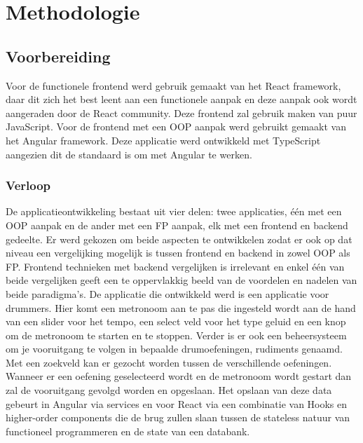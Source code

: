 
\chapter{Methodologie}
\label{ch:methodologie}


\section{Voorbereiding}
Voor de functionele frontend werd gebruik gemaakt van het React framework, daar dit zich het best leent aan een functionele aanpak en deze aanpak ook wordt aangeraden door de React community. Deze frontend zal gebruik maken van puur JavaScript. Voor de frontend met een OOP aanpak werd gebruikt gemaakt van het Angular framework. Deze applicatie werd ontwikkeld met TypeScript aangezien dit de standaard is om met Angular te werken.

\subsection{Verloop}
De applicatieontwikkeling bestaat uit vier delen: twee applicaties, één met een OOP aanpak en de ander met een FP aanpak, elk met een frontend en backend gedeelte. Er werd gekozen om beide aspecten te ontwikkelen zodat er ook op dat niveau een vergelijking mogelijk is tussen frontend en backend in zowel OOP als FP. Frontend technieken met backend vergelijken is irrelevant en enkel één van beide vergelijken geeft een te oppervlakkig beeld van de voordelen en nadelen van beide paradigma's. De applicatie die ontwikkeld werd is een applicatie voor drummers. Hier komt een metronoom aan te pas die ingesteld wordt aan de hand van een slider voor het tempo, een select veld voor het type geluid en een knop om de metronoom te starten en te stoppen. Verder is er ook een beheersysteem om je vooruitgang te volgen in bepaalde drumoefeningen, rudiments genaamd. Met een zoekveld kan er gezocht worden tussen de verschillende oefeningen. Wanneer er een oefening geselecteerd wordt en de metronoom wordt gestart dan zal de vooruitgang gevolgd worden en opgeslaan. Het opslaan van deze data gebeurt in Angular via services en voor React via een combinatie van Hooks en higher-order components die de brug zullen slaan tussen de stateless natuur van functioneel programmeren en de state van een databank.

